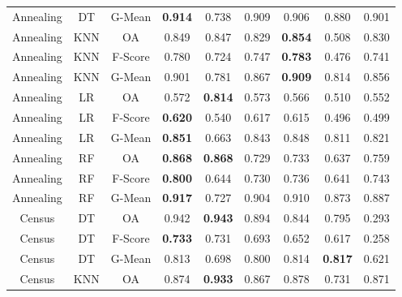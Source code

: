 \begin{longtable}{ccccccccc}
         Annealing &         DT &  G-Mean & \textbf{0.914} &          0.738 &          0.909 &          0.906 &          0.880 &          0.901 \\
         Annealing &        KNN &      OA &          0.849 &          0.847 &          0.829 & \textbf{0.854} &          0.508 &          0.830 \\
         Annealing &        KNN & F-Score &          0.780 &          0.724 &          0.747 & \textbf{0.783} &          0.476 &          0.741 \\
         Annealing &        KNN &  G-Mean &          0.901 &          0.781 &          0.867 & \textbf{0.909} &          0.814 &          0.856 \\
         Annealing &         LR &      OA &          0.572 & \textbf{0.814} &          0.573 &          0.566 &          0.510 &          0.552 \\
         Annealing &         LR & F-Score & \textbf{0.620} &          0.540 &          0.617 &          0.615 &          0.496 &          0.499 \\
         Annealing &         LR &  G-Mean & \textbf{0.851} &          0.663 &          0.843 &          0.848 &          0.811 &          0.821 \\
         Annealing &         RF &      OA & \textbf{0.868} & \textbf{0.868} &          0.729 &          0.733 &          0.637 &          0.759 \\
         Annealing &         RF & F-Score & \textbf{0.800} &          0.644 &          0.730 &          0.736 &          0.641 &          0.743 \\
         Annealing &         RF &  G-Mean & \textbf{0.917} &          0.727 &          0.904 &          0.910 &          0.873 &          0.887 \\
            Census &         DT &      OA &          0.942 & \textbf{0.943} &          0.894 &          0.844 &          0.795 &          0.293 \\
            Census &         DT & F-Score & \textbf{0.733} &          0.731 &          0.693 &          0.652 &          0.617 &          0.258 \\
            Census &         DT &  G-Mean &          0.813 &          0.698 &          0.800 &          0.814 & \textbf{0.817} &          0.621 \\
            Census &        KNN &      OA &          0.874 & \textbf{0.933} &          0.867 &          0.878 &          0.731 &          0.871 \\

\end{longtable}
